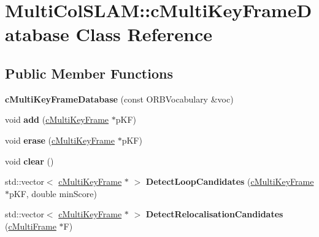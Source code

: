 \hypertarget{classMultiColSLAM_1_1cMultiKeyFrameDatabase}{}\section{Multi\+Col\+S\+L\+AM\+:\+:c\+Multi\+Key\+Frame\+Database Class Reference}
\label{classMultiColSLAM_1_1cMultiKeyFrameDatabase}
\subsection*{Public Member Functions}
\begin{DoxyCompactItemize}
\item 
{\bfseries c\+Multi\+Key\+Frame\+Database} (const O\+R\+B\+Vocabulary \&voc)\hypertarget{classMultiColSLAM_1_1cMultiKeyFrameDatabase_ab29a6160bdeb966b09d0be7d9218c246}{}\label{classMultiColSLAM_1_1cMultiKeyFrameDatabase_ab29a6160bdeb966b09d0be7d9218c246}

\item 
void {\bfseries add} (\hyperlink{classMultiColSLAM_1_1cMultiKeyFrame}{c\+Multi\+Key\+Frame} $\ast$p\+KF)\hypertarget{classMultiColSLAM_1_1cMultiKeyFrameDatabase_a38bd74684f7305328aeed1746114a552}{}\label{classMultiColSLAM_1_1cMultiKeyFrameDatabase_a38bd74684f7305328aeed1746114a552}

\item 
void {\bfseries erase} (\hyperlink{classMultiColSLAM_1_1cMultiKeyFrame}{c\+Multi\+Key\+Frame} $\ast$p\+KF)\hypertarget{classMultiColSLAM_1_1cMultiKeyFrameDatabase_ac0e6d14d82b485944b82a88323df936b}{}\label{classMultiColSLAM_1_1cMultiKeyFrameDatabase_ac0e6d14d82b485944b82a88323df936b}

\item 
void {\bfseries clear} ()\hypertarget{classMultiColSLAM_1_1cMultiKeyFrameDatabase_a87a52c69730c5447f0501b3d138dac03}{}\label{classMultiColSLAM_1_1cMultiKeyFrameDatabase_a87a52c69730c5447f0501b3d138dac03}

\item 
std\+::vector$<$ \hyperlink{classMultiColSLAM_1_1cMultiKeyFrame}{c\+Multi\+Key\+Frame} $\ast$ $>$ {\bfseries Detect\+Loop\+Candidates} (\hyperlink{classMultiColSLAM_1_1cMultiKeyFrame}{c\+Multi\+Key\+Frame} $\ast$p\+KF, double min\+Score)\hypertarget{classMultiColSLAM_1_1cMultiKeyFrameDatabase_aaad03ebcc61793922762f23362b841a2}{}\label{classMultiColSLAM_1_1cMultiKeyFrameDatabase_aaad03ebcc61793922762f23362b841a2}

\item 
std\+::vector$<$ \hyperlink{classMultiColSLAM_1_1cMultiKeyFrame}{c\+Multi\+Key\+Frame} $\ast$ $>$ {\bfseries Detect\+Relocalisation\+Candidates} (\hyperlink{classMultiColSLAM_1_1cMultiFrame}{c\+Multi\+Frame} $\ast$F)\hypertarget{classMultiColSLAM_1_1cMultiKeyFrameDatabase_ade0a91aa50a9ff43df3c17ff99496f7b}{}\label{classMultiColSLAM_1_1cMultiKeyFrameDatabase_ade0a91aa50a9ff43df3c17ff99496f7b}

\end{DoxyCompactItemize}
